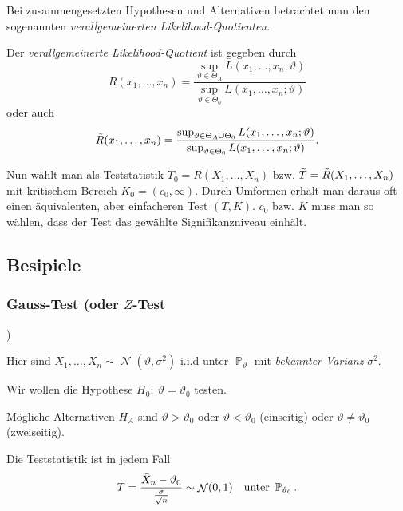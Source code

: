 \documentclass[a4paper,10pt]{article}
\renewcommand{\P}{\operatorname{\mathbb{P}}}
\DeclareMathOperator{\normal}{\mathcal{N}}
\numberwithin{equation}{section}
\begin{document}

Bei zusammengesetzten Hypothesen und Alternativen betrachtet man den sogenannten \emph{verallgemeinerten Likelihood-Quotienten}.
\begin{mainbox}{}
    Der \emph{verallgemeinerte Likelihood-Quotient} ist gegeben durch
    \[
        R(x_1, \dots, x_n) = \frac{\sup_{\vartheta \in \Theta_A} L(x_1, \dots, x_n; \vartheta)}{\sup_{\vartheta \in \Theta_0} L(x_1, \dots, x_n; \vartheta)}
    \]
    oder auch
    \[
        \Tilde{R}(x_1, \dots, x_n) = \frac{\sup_{\vartheta \in \Theta_A \cup \Theta_0} L(x_1, \dots, x_n; \vartheta)}{\sup_{\vartheta \in \Theta_0} L(x_1, \dots, x_n; \vartheta)} \text{.}
    \]
\end{mainbox}

Nun wählt man als Teststatistik \( T_0 = R(X_1, \dots, X_n) \) bzw. \( \Tilde{T} = \Tilde{R}(X_1, \dots, X_n) \) mit kritischem Bereich \( K_0 = (c_0, \infty) \).
Durch Umformen erhält man daraus oft einen äquivalenten, aber einfacheren Test \( (T, K) \).
\( c_0 \) bzw. \( K \) muss man so wählen, dass der Test das gewählte Signifikanzniveau einhält.

\subsection{Besipiele}

\subsubsection{Gauss-Test (oder \( Z \)-Test})

Hier sind \( X_1, \dots, X_n \sim \normal(\vartheta, \sigma^2) \) i.i.d unter \( \P_\vartheta \) mit \emph{bekannter Varianz} \( \sigma^2 \).

Wir wollen die Hypothese \( H_0: \: \vartheta = \vartheta_0 \) testen.

Mögliche Alternativen \( H_A \) sind \( \vartheta > \vartheta_0 \) oder \( \vartheta < \vartheta_0 \) (einseitig) oder \( \vartheta \neq \vartheta_0 \) (zweiseitig).

Die Teststatistik ist in jedem Fall
\[
    T = \frac{\Bar{X}_n - \vartheta_0}{\frac{\sigma}{\sqrt{n}}} \sim \normal(0, 1) \quad \text{unter } \P_{\vartheta_0} \text{.}
\]
\end{document}
